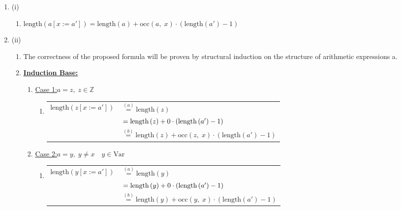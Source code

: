 \documentclass[12pt]{scrartcl}
\begin{document}
	\begin{enumerate}
		\item[] (i)
		\begin{enumerate}
			\item[] $\text{length}\left(a\left[x:=a'\right]\right)=\text{length}\left(a\right)+\text{occ}\left(a,\;x\right)\cdot\left(\text{length}\left(a'\right)-1\right)$
		\end{enumerate}
		\item[] (ii)
		\begin{enumerate}
			\item[] The correctness of the proposed formula will be proven by structural induction on the structure of arithmetic expressions a.
			\item[] \underline{\textbf{Induction Base:}}
			\begin{enumerate}
				\item[] \underline{Case 1:}\quad $a=z,\; z\in \mathbb{Z}$
				\begin{enumerate}
					\item[] 
					\begin{tabular}{ll}
						$\text{length}\left(z\left[x:=a'\right]\right)$ 
						  & $\overset{\left(a\right)}{=}\text{length}\left(z\right)$\\
						  & $\hspace*{1.75pt}=\text{length}\left(z\right)+0\cdot\left(\text{length}\left(a'\right)-1\right)$\\
						  & $\overset{\left(b\right)}{=}\text{length}\left(z\right)+\text{occ}\left(z,\;x\right)\cdot\left(\text{length}\left(a'\right)-1\right)$\\
					\end{tabular}
				\end{enumerate}
				\item[] \underline{Case 2:}\quad $a=y,\; y\neq x\quad y\in \text{Var}$
				\begin{enumerate}
					\item[]
					\begin{tabular}{ll}
						$\text{length}\left(y\left[x:=a'\right]\right)$ 
						  & $\overset{\left(a\right)}{=}\text{length}\left(y\right)$\\
						  & $\hspace*{1.75pt}=\text{length}\left(y\right)+0\cdot\left(\text{length}\left(a'\right)-1\right)$\\
						  & $\overset{\left(b\right)}{=}\text{length}\left(y\right)+\text{occ}\left(y,\;x\right)\cdot\left(\text{length}\left(a'\right)-1\right)$\\

\end{tabular}
\end{enumerate}
\end{enumerate}
\end{enumerate}
\end{enumerate}
\end{document}
